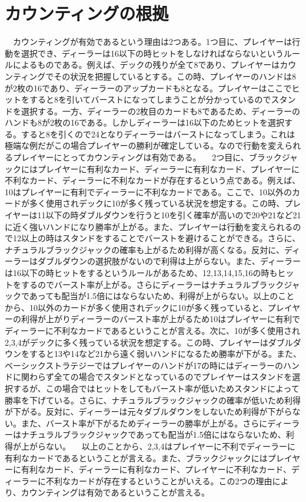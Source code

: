 \section{カウンティングの根拠}
\ \ カウンティングが有効であるという理由は2つある。1つ目に、プレイヤーは行動を選択でき、ディーラーは16以下の時ヒットをしなければならないというルールによるものである。例えば、デックの残りが全て8であり、プレイヤーはカウンティングでその状況を把握しているとする。この時、プレイヤーのハンドは8が2枚の16であり、ディーラーのアップカードも8となる。プレイヤーはここでヒットをすると8を引いてバーストになってしまうことが分かっているのでスタンドを選択する。一方、ディーラーの2枚目のカードも8であるため、ディーラーのハンドも8が2枚の16である。しかしディーラーは16以下のためヒットを選択する。すると8を引くので24となりディーラーはバーストになってしまう。これは極端な例だがこの場合プレイヤーの勝利が確定している。なので行動を変えられるプレイヤーにとってカウンティングは有効である。
\ \ 2つ目に、ブラックジャックにはプレイヤーに有利なカード、ディーラーに有利なカード、プレイヤーに不利なカード、ディーラーに不利なカードが存在するという点である。例えば、10はプレイヤーに有利でディーラーに不利なカードである。ここで、10以外のカードが多く使用されデックに10が多く残っている状況を想定する。この時、プレイヤーは11以下の時ダブルダウンを行うと10を引く確率が高いので20や21など21に近く強いハンドになり勝率が上がる。また、プレイヤーは行動を変えられるので12以上の時はスタンドをすることでバーストを避けることができる。さらに、ナチュラルブラックジャックの確率も上がるため利得が高くなる。反対に、ディーラーはダブルダウンの選択肢がないので利得は上がらない。また、ディーラーは16以下の時ヒットをするというルールがあるため、12,13,14,15,16の時もヒットをするのでバースト率が上がる。さらにディーラーはナチュラルブラックジャックであっても配当が1.5倍にはならないため、利得が上がらない。以上のことから、10以外のカードが多く使用されデックに10が多く残っていると、プレイヤーの利得が上がりディーラーのバースト率が上がるため10はプレイヤーに有利でディーラーに不利なカードであるということが言える。次に、10が多く使用され2,3,4がデックに多く残っている状況を想定する。この時、プレイヤーはダブルダウンをすると13や14など21から遠く弱いハンドになるため勝率が下がる。また、ベーシックストラテジーではプレイヤーのハンドが17の時にはディーラーのハンドに関わらず全ての場合でスタンドとなっているのでプレイヤーはスタンドを選択するが、この場合ではヒットをしてもバースト率が低いためスタンドによって勝率を下げている。さらに、ナチュラルブラックジャックの確率が低いため利得が下がる。反対に、ディーラーは元々ダブルダウンをしないため利得が下がらない。また、バースト率が下がるためディーラーの勝率が上がる。さらにディーラーはナチュラルブラックジャックであっても配当が1.5倍にはならないため、利得が上がらない。
\ \ 以上のことから、2,3,4はプレイヤーに不利でディーラーに有利なカードであるということが言える。また、ブラックジャックにはプレイヤーに有利なカード、ディーラーに有利なカード、プレイヤーに不利なカード、ディーラーに不利なカードが存在するということがいえる。この2つの理由により、カウンティングは有効であるということが言える。

